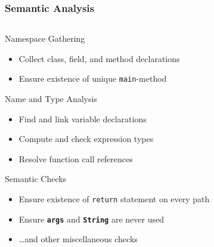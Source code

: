 \documentclass[navbaroff,en]{sdqbeamer}
\begin{document}
\begin{frame}
	\frametitle{Semantic Analysis}
	\begin{columns}
		\begin{column}{0.52\textwidth}

	\begin{contentblock}{Namespace Gathering}
		\begin{itemize}
			\item Collect class, field, and method declarations
			\item Ensure existence of unique \texttt{main}-method
		\end{itemize}
	\end{contentblock}


	\begin{contentblock}{Name and Type Analysis}
		\begin{itemize}
			\item Find and link variable declarations
			\item Compute and check expression types
			\item Resolve function call references
		\end{itemize}
	\end{contentblock}


	\begin{contentblock}{Semantic Checks}
		\begin{itemize}
			\item Ensure existence of \texttt{return} statement on every path
			\item Ensure \texttt{\textbf{args}} and \texttt{\textbf{String}} are never used
			\item \dots and other miscellaneous checks
		\end{itemize}
	\end{contentblock}

\end{column}


\end{columns}
\end{frame}
\end{document}
